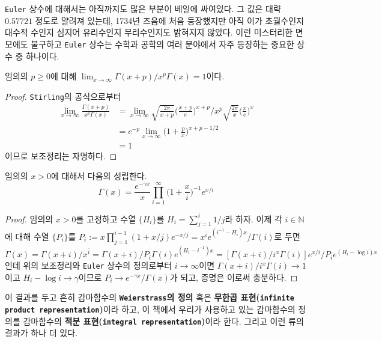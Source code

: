 \texttt{Euler} 상수에 대해서는 아직까지도 많은 부분이 베일에 싸여있다. 그 값은 대략 $0.57721$ 정도로 얄려져 있는데, 1734년 즈음에 처음 등장했지만 아직 이가 초월수인지 대수적 수인지 심지어 유리수인지 무리수인지도 밝혀지지 않았다. 이런 미스터리한 면모에도 불구하고 \texttt{Euler} 상수는 수학과 공학의 여러 분야에서 자주 등장하는 중요한 상수 중 하나이다.

\begin{lemma}
    임의의 $p\geq0$에 대해 $\lim_{x\to\infty}\Gamma(x+p)/x^p\Gamma(x)=1$이다.
\end{lemma}

\begin{proof}
    \texttt{Stirling}의 공식으로부터
    \begin{align*}
        \lim_{x\to\infty}\frac{\Gamma(x+p)}{x^p\Gamma(x)}&=\lim_{x\to\infty}\sqrt{\frac{2\pi}{x+p}}\bigg(\frac{x+p}{e}\bigg)^{x+p}\bigg/x^p\sqrt{\frac{2\pi}{x}}\bigg(\frac{x}{e}\bigg)^x\\
        &=e^{-p}\lim_{x\to\infty}\bigg(1+\frac{p}{x}\bigg)^{x+p-1/2}\\
        &=1
    \end{align*}
    이므로 보조정리는 자명하다.
\end{proof}

\begin{theorem}[Weierstrass]
    임의의 $x>0$에 대해서 다음의 성립한다.
    \begin{equation*}
        \Gamma(x)=\frac{e^{-\gamma x}}{x}\prod_{i=1}^\infty\bigg(1+\frac{x}{i}\bigg)^{-1}e^{x/i}
    \end{equation*}
\end{theorem}

\begin{proof}
    임의의 $x>0$를 고정하고 수열 $\{H_i\}$를 $H_i=\sum_{j=1}^i1/j$라 하자. 이제 각 $i\in\mathbb{N}$에 대해 수열 $\{P_i\}$를 $P_i:=x\prod_{j=1}^{i-1}(1+x/j)e^{-x/j}=x^{\overline{i}}e^{(i^{-1}-H_i)x}/\Gamma(i)$로 두면 $\Gamma(x)=\Gamma(x+i)/x^{\overline{i}}=\Gamma(x+i)/P_i\Gamma(i)e^{(H_i-i^{-1})x}=[\Gamma(x+i)/i^x\Gamma(i)]e^{x/i}/P_ie^{(H_i-\log i)x}$인데 위의 보조정리와 \texttt{Euler} 상수의 정의로부터 $i\to\infty$이면 $\Gamma(x+i)/i^x\Gamma(i)\to1$이고 $H_i-\log i\to\gamma$이므로 $P_i\to e^{-\gamma x}/\Gamma(x)$가 되고, 증명은 이로써 충분하다.
\end{proof}

이 결과를 두고 흔히 감마함수의 \textbf{\texttt{Weierstrass}의 정의} 혹은 \textbf{무한곱 표현(\texttt{infinite product representation})}이라 하고, 이 책에서 우리가 사용하고 있는 감마함수의 정의를 감마함수의 \textbf{적분 표현(\texttt{integral representation})}이라 한다. 그리고 이런 류의 결과가 하나 더 있다.


